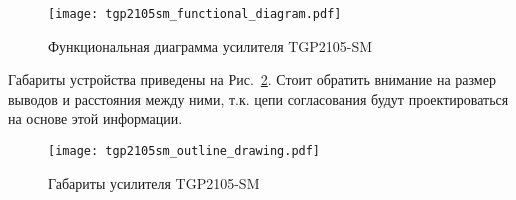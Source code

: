 \begin{figure}[!ht]
    \centering
    \texttt{[image: tgp2105sm\_functional\_diagram.pdf]}
    \caption{Функциональная диаграмма усилителя TGP2105-SM}%
    \label{fig:tgp2105sm_functional_diagram}
\end{figure}

Габариты устройства приведены на Рис.~\ref{fig:tgp2105sm_outline_drawing}.
Стоит обратить внимание на размер выводов и расстояния между ними, т.к. цепи согласования будут проектироваться на основе этой информации.

\begin{figure}[!ht]
    \centering
    \texttt{[image: tgp2105sm\_outline\_drawing.pdf]}
    \caption{Габариты усилителя TGP2105-SM}%
    \label{fig:tgp2105sm_outline_drawing}
\end{figure}
